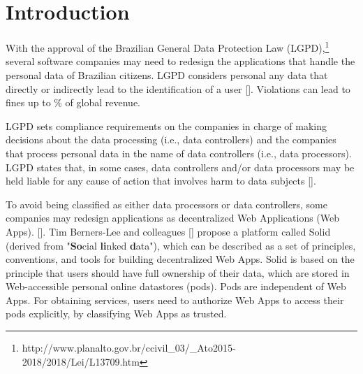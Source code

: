 \documentclass[sigconf]{acmart}
\begin{document}

%

%
\maketitle

\section{Introduction}

With the approval of the Brazilian General Data Protection Law (LGPD),\footnote{http://www.planalto.gov.br/ccivil\_03/\_Ato2015-2018/2018/Lei/L13709.htm} several software companies may need to redesign the applications that handle the personal data of Brazilian citizens. LGPD considers personal any data that directly or indirectly lead to the identification of a user []. Violations can lead to fines up to \% of global revenue.

LGPD sets compliance requirements on the companies in charge of making decisions about the data processing (i.e., data controllers) and the companies that process personal data in the name of data controllers (i.e., data processors). LGPD states that, in some cases, data controllers and/or data processors may be held liable for any cause of action that involves harm to data subjects [].

To avoid being classified as either data processors or data controllers, some companies may redesign applications as decentralized Web Applications (Web Apps).  []. Tim Berners-Lee and colleagues [] propose a platform called Solid (derived from "\textbf{So}cial \textbf{li}nked \textbf{d}ata"), which can be described as a set of principles, conventions, and tools for building decentralized Web Apps. Solid is based on the principle that users should have full ownership of their data, which are stored in Web-accessible personal online datastores (pods). Pods are independent of Web Apps. For obtaining services, users need to authorize Web Apps to access their pods explicitly, by classifying Web Apps as trusted.
\end{document}
